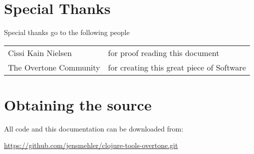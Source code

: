 \chapter{Special Thanks}
Special thanks go to the following people

\begin{tabular}{l l}
Cissi Kain Nielsen & for proof reading this document\\
The Overtone Community & for creating this great piece of Software\\
\end{tabular}

\chapter{Obtaining the source}
All code and this documentation can be downloaded from:

\url{https://github.com/jensmehler/clojure-tools-overtone.git}


